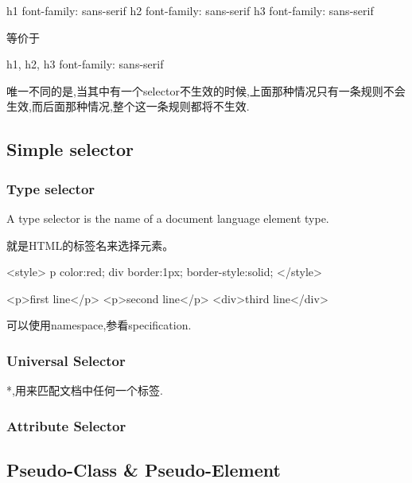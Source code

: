 \begin{CSS}
h1 { font-family: sans-serif }
h2 { font-family: sans-serif }
h3 { font-family: sans-serif }
\end{CSS}

等价于

\begin{CSS}

h1, h2, h3 { font-family: sans-serif }

\end{CSS}


唯一不同的是,当其中有一个selector不生效的时候,上面那种情况只有一条规则不会生效,而后面那种情况,整个这一条规则都将不生效.

\subsection{Simple selector}



\subsubsection{Type selector}

A type selector is the name of a document language element type.

就是HTML的标签名来选择元素。

\begin{CSS}
<style>
p {color:red;}
div {border:1px; border-style:solid;}
</style>

<p>first line</p>
<p>second line</p>
<div>third line</div>
\end{CSS}

可以使用namespace,参看specification.

\subsubsection{Universal Selector}

*,用来匹配文档中任何一个标签.

\subsubsection{Attribute Selector}



\subsection{Pseudo-Class \& Pseudo-Element}

